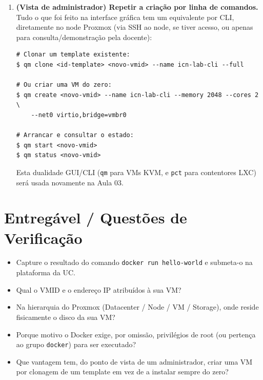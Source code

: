 \documentclass[11pt,a4paper]{article}
\begin{document}
\begin{enumerate}[label=\arabic*.]
  \item \textbf{(Vista de administrador) Repetir a criação por linha de comandos.} Tudo o que foi feito na interface gráfica tem um equivalente por CLI, diretamente no node Proxmox (via SSH ao node, se tiver acesso, ou apenas para consulta/demonstração pela docente):
\begin{lstlisting}
# Clonar um template existente:
$ qm clone <id-template> <novo-vmid> --name icn-lab-cli --full

# Ou criar uma VM do zero:
$ qm create <novo-vmid> --name icn-lab-cli --memory 2048 --cores 2 \
    --net0 virtio,bridge=vmbr0

# Arrancar e consultar o estado:
$ qm start <novo-vmid>
$ qm status <novo-vmid>
\end{lstlisting}
  Esta dualidade GUI/CLI (\texttt{qm} para VMs KVM, e \texttt{pct} para contentores LXC) será usada novamente na Aula 03.

\end{enumerate}

\section{Entregável / Questões de Verificação}
\begin{itemize}[itemsep=0.2cm]
  \item Capture o resultado do comando \texttt{docker run hello-world} e submeta-o na plataforma da UC.
  \item Qual o VMID e o endereço IP atribuídos à sua VM?
  \item Na hierarquia do Proxmox (Datacenter / Node / VM / Storage), onde reside fisicamente o disco da sua VM?
  \item Porque motivo o Docker exige, por omissão, privilégios de root (ou pertença ao grupo \texttt{docker}) para ser executado?
  \item Que vantagem tem, do ponto de vista de um administrador, criar uma VM por clonagem de um template em vez de a instalar sempre do zero?
\end{itemize}
\end{document}
